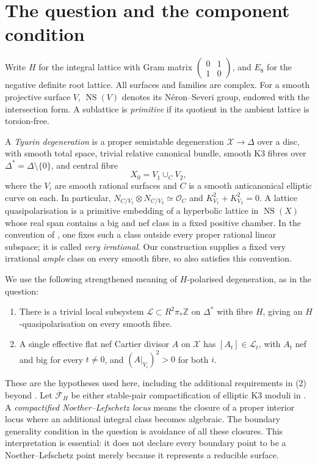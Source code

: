 \documentclass[11pt]{article}
\theoremstyle{definition}
\theoremstyle{remark}
\newcommand{\Z}{\mathbb Z}
\newcommand{\NS}{\operatorname{NS}}
\newcommand{\OO}{\mathcal O}
\begin{document}
\section{The question and the component condition}

Write $H$ for the integral lattice with Gram matrix $\left(\begin{smallmatrix}0&1\\1&0\end{smallmatrix}\right)$, and $E_8$ for the negative definite root lattice. All surfaces and families are complex. For a smooth projective surface $V$, $\NS(V)$ denotes its N\'eron--Severi group, endowed with the intersection form. A sublattice is \emph{primitive} if its quotient in the ambient lattice is torsion-free.

A \emph{Tyurin degeneration} is a proper semistable degeneration $\mathcal X\to\Delta$ over a disc, with smooth total space, trivial relative canonical bundle, smooth K3 fibres over $\Delta^*=\Delta\setminus\{0\}$, and central fibre
\[
X_0=V_1\cup_C V_2,
\]
where the $V_i$ are smooth rational surfaces and $C$ is a smooth anticanonical elliptic curve on each. In particular, $N_{C/V_1}\otimes N_{C/V_2}\simeq\OO_C$ and $K_{V_1}^2+K_{V_2}^2=0$.
A lattice quasipolarisation is a primitive embedding of a hyperbolic lattice in $\NS(X)$ whose real span contains a big and nef class in a fixed positive chamber. In the convention of \cite[\S2B]{AE}, one fixes such a class outside every proper rational linear subspace; it is called \emph{very irrational}. Our construction supplies a fixed very irrational \emph{ample} class on every smooth fibre, so also satisfies this convention.

We use the following strengthened meaning of $H$-polarised degeneration, as in the question:
\begin{enumerate}
\item There is a trivial local subsystem $\mathcal L\subset R^2\pi_*\Z$ on $\Delta^*$ with fibre $H$, giving an $H$-quasipolarisation on every smooth fibre.
\item A single effective flat nef Cartier divisor $A$ on $\mathcal X$ has $[A_t]\in\mathcal L_t$, with $A_t$ nef and big for every $t\ne0$, and $(A|_{V_i})^2>0$ for both $i$.
\end{enumerate}
These are the hypotheses used here, including the additional requirements in (2) beyond \cite[Definition~3.20]{GT}. Let $\overline{\mathcal F}_H$ be either stable-pair compactification of elliptic K3 moduli in \cite{ABE}. A \emph{compactified Noether--Lefschetz locus} means the closure of a proper interior locus where an additional integral class becomes algebraic. The boundary generality condition in the question is avoidance of all these closures. This interpretation is essential: it does not declare every boundary point to be a Noether--Lefschetz point merely because it represents a reducible surface.
\end{document}
